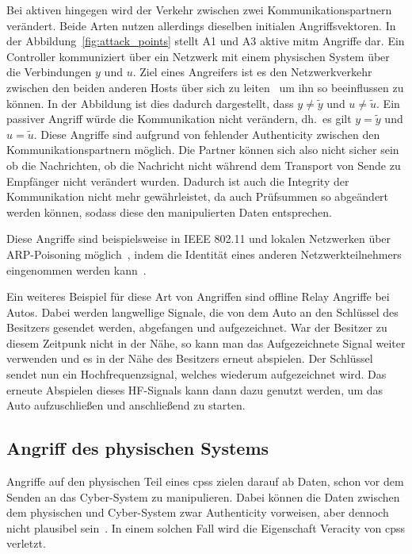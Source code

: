 \documentclass[final,bibliography=totocnumbered]{include/sikseminar}
\newcommand{\cps}{\glspl{cps}\xspace}
\begin{document}
    Bei aktiven hingegen wird der Verkehr zwischen zwei Kommunikationspartnern verändert.
    Beide Arten nutzen allerdings dieselben initialen Angriffsvektoren.
    In der Abbildung~\ref{fig:attack_points} stellt A1 und A3 aktive \gls{mitm} Angriffe dar.
    Ein Controller kommuniziert über ein Netzwerk mit einem physischen System über die Verbindungen $y$ und $u$.
    Ziel eines Angreifers ist es den Netzwerkverkehr zwischen den beiden anderen Hosts über sich zu leiten~\cite{WYX+10,FPA+18} um ihn so beeinflussen zu können.
    In der Abbildung ist dies dadurch dargestellt, dass $y \ne \tilde{y}$ und $u \ne \tilde{u}$.
    Ein passiver Angriff würde die Kommunikation nicht verändern, dh.\ es gilt $y = \tilde{y}$ und $u = \tilde{u}$.
    Diese Angriffe sind aufgrund von fehlender Authenticity zwischen den Kommunikationspartnern möglich.
    Die Partner können sich also nicht sicher sein ob die Nachrichten, ob die Nachricht nicht während dem Transport von Sende zu Empfänger nicht verändert wurden.
    Dadurch ist auch die Integrity der Kommunikation nicht mehr gewährleistet, da auch Prüfsummen so abgeändert werden können, sodass diese den manipulierten Daten entsprechen.

    Diese Angriffe sind beispielsweise in IEEE 802.11 und lokalen Netzwerken über ARP-Poisoning möglich~\cite{FIT+12}, indem die Identität eines anderen Netzwerkteilnehmers eingenommen werden kann~\cite{RN05}.

    Ein weiteres Beispiel für diese Art von Angriffen sind offline Relay Angriffe bei Autos.
    Dabei werden langwellige Signale, die von dem Auto an den Schlüssel des Besitzers gesendet werden, abgefangen und aufgezeichnet.
    War der Besitzer zu diesem Zeitpunk nicht in der Nähe, so kann man das Aufgezeichnete Signal weiter verwenden und es in der Nähe des Besitzers erneut abspielen.
    Der Schlüssel sendet nun ein Hochfrequenzsignal, welches wiederum aufgezeichnet wird.
    Das erneute Abspielen dieses HF-Signals kann dann dazu genutzt werden, um das Auto aufzuschließen und anschließend zu starten.~\cite{HLL+17}

    \subsection{Angriff des physischen Systems}
    \label{subsec:physical-deception}
    Angriffe auf den physischen Teil eines \cps zielen darauf ab Daten, schon vor dem Senden an das Cyber-System zu manipulieren.
    Dabei können die Daten zwischen dem physischen und Cyber-System zwar Authenticity vorweisen, aber dennoch nicht plausibel sein~\cite{SFJ17}.
    In einem solchen Fall wird die Eigenschaft Veracity von \cps verletzt.
\end{document}
